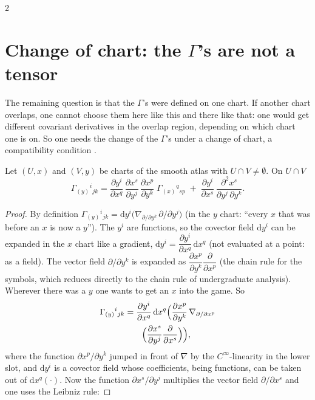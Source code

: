 \begin{paracol}{2}
\section{Change of chart: the $\Gamma$'s are not a tensor}\label{sec:c07-transf}

The remaining question is that the $\Gamma$'s were defined on one chart. If another chart overlaps, one cannot choose them here like this and there like that: one would get different covariant derivatives in the overlap region, depending on which chart one is on. So one needs the change of the $\Gamma$'s under a change of chart, a compatibility condition .

\begin{theorem}\label{thm:c07-transf}
Let $(U,x)$ and $(V,y)$ be charts of the smooth atlas with $U\cap V\neq\emptyset$. On $U\cap V$
\[
  \Gamma_{(y)}{}^i{}_{jk}=\frac{\partial y^i}{\partial x^q}\,\frac{\partial x^s}{\partial y^j}\,\frac{\partial x^p}{\partial y^k}\;\Gamma_{(x)}{}^q{}_{sp}\;+\;\frac{\partial y^i}{\partial x^s}\,\frac{\partial^2x^s}{\partial y^j\,\partial y^k}.
\]
\end{theorem}
\begin{proof}
By definition $\Gamma_{(y)}{}^i{}_{jk}=\mathrm dy^i\bigl(\nabla_{\partial/\partial y^k}\,\partial/\partial y^j\bigr)$ (in the $y$ chart: ``every $x$ that was before an $x$ is now a $y$''). The $y^i$ are functions, so the covector field $\mathrm dy^i$ can be expanded in the $x$ chart like a gradient, $\mathrm dy^i=\dfrac{\partial y^i}{\partial x^q}\,\mathrm dx^q$ (not evaluated at a point: as a field). The vector field $\partial/\partial y^k$ is expanded as $\dfrac{\partial x^p}{\partial y^k}\dfrac{\partial}{\partial x^p}$ (the chain rule for the symbols, which reduces directly to the chain rule of undergraduate analysis). Wherever there was a $y$ one wants to get an $x$ into the game. So
\begin{align*}
  \Gamma_{(y)}{}^i{}_{jk}&=\frac{\partial y^i}{\partial x^q}\,\mathrm dx^q\Bigl(\frac{\partial x^p}{\partial y^k}\,\nabla_{\partial/\partial x^p}\\ &\qquad\Bigl(\frac{\partial x^s}{\partial y^j}\frac{\partial}{\partial x^s}\Bigr)\Bigr),
\end{align*}
where the function $\partial x^p/\partial y^k$ jumped in front of $\nabla$ by the $C^\infty$-linearity in the lower slot, and $\mathrm dy^i$ is a covector field whose coefficients, being functions, can be taken out of $\mathrm dx^q(\cdot)$. Now the function $\partial x^s/\partial y^j$ multiplies the vector field $\partial/\partial x^s$ and one uses the Leibniz rule:

\end{proof}
\end{paracol}
